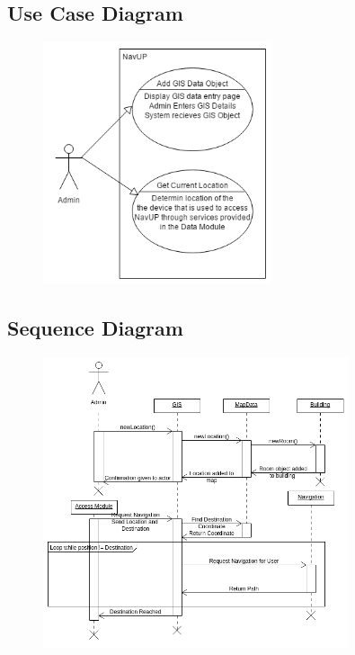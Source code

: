 \subsection{Use Case Diagram}

\begin{figure}[!htbp]
  \includegraphics[width=0.6\textwidth]{GIS/GIS_Use_case.png}
\end{figure}


\subsection{Sequence Diagram}
\begin{figure}[!htbp]
	\includegraphics[width=0.8\textwidth]{GIS/GIS_Sequence_Diagram.png}
\end{figure}

